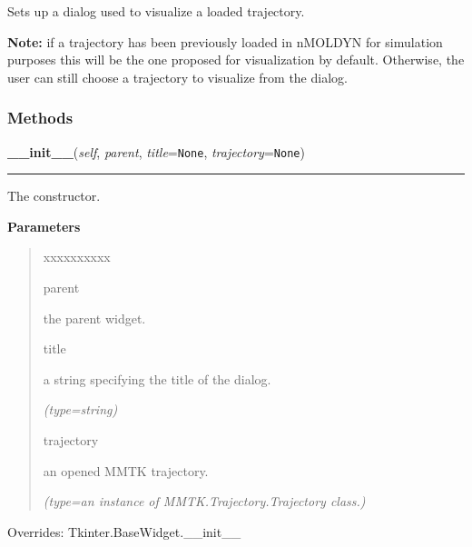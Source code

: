 Sets up a dialog used to visualize a loaded trajectory.

\textbf{Note:} if a trajectory has been previously loaded in nMOLDYN for simulation 
purposes this will be the one proposed for visualization by default. 
Otherwise, the user can still choose a trajectory to visualize from the 
dialog.





  \subsubsection{Methods}

    \vspace{0.5ex}

\hspace{.8\funcindent}\begin{boxedminipage}{\funcwidth}

    \raggedright \textbf{\_\_init\_\_}(\textit{self}, \textit{parent}, \textit{title}={\tt None}, \textit{trajectory}={\tt None})

    \vspace{-1.5ex}

    \rule{\textwidth}{0.5\fboxrule}
\setlength{\parskip}{2ex}
    The constructor.

\setlength{\parskip}{1ex}
      \textbf{Parameters}
      \vspace{-1ex}

      \begin{quote}
        \begin{Ventry}{xxxxxxxxxx}

          \item[parent]

          the parent widget.

          \item[title]

          a string specifying the title of the dialog.

            {\it (type=string)}

          \item[trajectory]

          an opened MMTK trajectory.

            {\it (type=an instance of MMTK.Trajectory.Trajectory class.)}

        \end{Ventry}

      \end{quote}

      Overrides: Tkinter.BaseWidget.\_\_init\_\_

    \end{boxedminipage}

